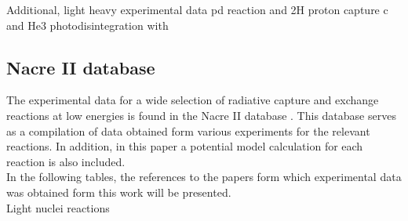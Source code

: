 \documentclass[openany]{book}
\begin{document}
Additional, light heavy experimental data pd reaction \cite{bystritsky_gerasimov_krylov_parzhitskii_dudkin_kaminskii_nechaev_padalko_petrov_mesyats_et_2008} and 2H proton capture c\cite{schmid_chasteler_laymon_weller_prior_tilley_1995} and He3 photodisintegration \cite{berman_koester_smith_1964} with \cite{warren_erdman_robertson_axen_macdonald_1963}

\subsection{Nacre II database} \label{sub:nacreII}

The experimental data for a wide selection of radiative capture and exchange reactions at low energies is found in the Nacre II database \cite{xu_takahashi_goriely_arnould_ohta_utsunomiya_2013}. This database serves as a compilation of data obtained form various experiments for the relevant reactions. In addition, in this paper a potential model calculation for each reaction is also included.\\

In the following tables, the references to the papers form which experimental data was obtained form this work will be presented. \\

Light nuclei reactions
\end{document}
